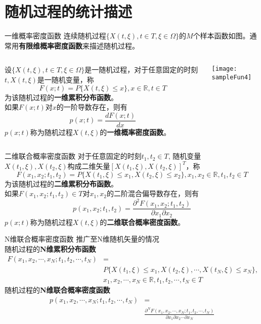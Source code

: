 \section{随机过程的统计描述}

\begin{frame}{一维概率密度函数}
连续随机过程$\{X(t,\xi),t\in T,\xi\in\Omega \}$的$M$个样本函数如图。通常用\textbf{有限维概率密度函数}来描述随机过程。

\medskip
\begin{columns}
	\begin{block}{}
		设$\{X(t,\xi),t\in T,\xi\in\Omega \}$是一随机过程，对于任意固定的时刻$t,X(t,\xi)$是一随机变量，称
		\[F(x;t)=P\{X(t,\xi)\le x\},x\in\mathbb{R},t\in T \]
		为该随机过程的\textbf{一维累积分布函数}。\\
		如果$F(x;t)$对$x$的一阶导数存在，则有
		\[p(x;t)=\frac{dF(x;t)}{dx}\]
		$p(x;t)$称为随机过程$X(t,\xi)$的\textbf{一维概率密度函数}。
	\end{block}
	\texttt{[image: sampleFun4]}
\end{columns}
\end{frame}

\begin{frame}{二维联合概率密度函数}
对于任意固定的时刻$t_1,t_2\in T$, 随机变量$X(t_1,\xi),X(t_2,\xi)$构成二维矢量$[X(t_1,\xi),X(t_2,\xi)]^T$，称
\[F(x_1,x_2;t_1,t_2)=P\{X(t_1,\xi)\le x_1,X(t_2,\xi)\le x_2\},x_1,x_2\in\mathbb{R},t_1,t_2\in T \]
为该随机过程的\textbf{二维累积分布函数}。\\
如果$F(x_1,x_2;t_1,t_2)\in T$对$x_1,x_2$的二阶混合偏导数存在，则有
\[p(x_1,x_2;t_1,t_2)=\frac{\partial^2 F(x_1,x_2;t_1,t_2)}{\partial x_1\partial x_2}\]
$p(x;t)$称为随机过程$X(t,\xi)$的\textbf{二维联合概率密度函数}。
\end{frame}

\begin{frame}{N维联合概率密度函数}
推广至N维随机矢量的情况\\
随机过程的\textbf{N维累积分布函数}
\begin{align*}
F(x_1,x_2,\cdots,x_N;t_1,t_2,\cdots,t_N)&=\\
&P\{X(t_1,\xi)\le x_1,X(t_2,\xi),\cdots,X(t_N,\xi)\le x_N\},&\\
&x_1,x_2,\cdots,x_N\in\mathbb{R},t_1,t_2,\cdots,t_N\in T
\end{align*}
随机过程的\textbf{N维联合概率密度函数}
\begin{align*}
p(x_1,x_2,\cdots,x_N;t_1,t_2,\cdots,t_N)&=\\
&\frac{\partial^N F(x_1,x_2,\cdots,x_N;t_1,t_2,\cdots,t_N)}{\partial x_1\partial x_2\cdots\partial x_N}
\end{align*}
\end{frame}

